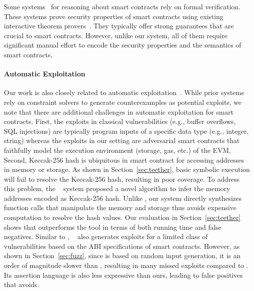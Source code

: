 Some systems~\cite{Hirai17,GrishchenkoMS18,kframework} for reasoning about smart contracts
rely on formal verification. These systems prove security properties of smart
contracts using existing interactive theorem provers~\cite{coq}. They
typically offer strong guarantees that are crucial to smart contracts. However,
unlike our system, all of them require significant manual effort to encode the
security properties and the semantics of smart contracts.


\paragraph{Automatic Exploitation}
Our work is also closely related to automatic
exploitation~\cite{AvgerinosCHB11,ChaARB12,teether,contractfuzzer}. While  
prior systems rely on constraint solvers to generate counterexamples as
potential exploits, we note that there are additional challenges in automatic
exploitation for smart contracts. First, the exploits in classical
vulnerabilities (e.g., buffer overflows, SQL injections) are typically program
inputs of a specific data type (e.g., integer, string) whereas the exploits in
our setting are adversarial smart contracts that faithfully model the execution
environment (storage, gas, etc.) of the EVM. Second, Keccak-256 hash is
ubiquitous in smart contract for accessing addresses in memory or storage. As
shown in Section~\ref{sec:teether}, basic symbolic execution will fail to
resolve the Keccak-256 hash, resulting in poor coverage. To address this
problem, the \teether~\cite{teether} system proposed a novel algorithm to infer
the memory addresses encoded as Keccak-256 hash. Unlike \teether, our system
directly synthesizes function calls that manipulate the memory and storage thus
avoids expensive computation to resolve the hash values. Our evaluation in
Section~\ref{sec:teether} shows that \toolname outperforms the \teether tool in
terms of both running time and false negatives.  
Similar to \toolname, \contractfuzz~\cite{contractfuzzer} also generates exploits for 
a limited class of vulnerabilities based on the ABI specifications of smart contracts.
However, as shown in Section~\ref{sec:fuzz}, since \contractfuzz is 
based on random input generation, it is an order of magnitude slower than \toolname, 
resulting in many missed exploits compared to \toolname. Its assertion language is 
also less expressive than ours, leading to false positives that 
\toolname avoids.

